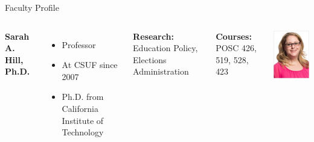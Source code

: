 \documentclass[10pt]{beamer}
\newlength{\imageheight}
\begin{document}
        \begin{frame}{Faculty Profile}
        \begin{columns}[t]
        \textbf{Sarah A. Hill, Ph.D.}
        \begin{itemize}
        \item Professor
        \item At CSUF since 2007
        \item Ph.D. from California Institute of Technology
        \end{itemize}
        
        \textbf{Research:} Education Policy, Elections Administration
        
        \textbf{Courses:} POSC 426, 519, 528, 423
        
        \vspace*{0.5cm}
        \includegraphics[height=\imageheight]{images/hill.jpg}
        \end{columns}
        \end{frame}
        
\end{document}
